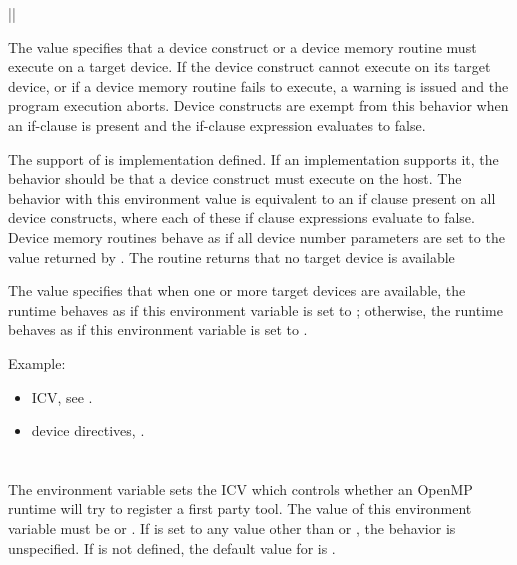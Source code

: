{||}

The  value specifies that a device construct or a device memory routine must execute on a target device. If the device construct cannot execute on its target device, or if a device memory routine fails to execute, a warning is issued and the program execution aborts. Device constructs are exempt from this behavior when an if-clause is present and the if-clause expression evaluates to false.

The support of   is implementation defined. If an implementation supports it, the behavior should be that a device construct must execute on the host.  The behavior with this environment value is equivalent to an if clause present on all device constructs, where each of these if clause expressions evaluate to false. Device memory routines behave as if all device number parameters are set to the value returned by . The  routine returns that no target device is available

The  value specifies that when one or more target devices are available, the runtime behaves as if this environment variable is set to ; otherwise, the runtime behaves as if this environment variable is set to .

Example:
\begin{ompEnv}
\end{ompEnv}

\crossreferences
\begin{itemize}
\item {} ICV, see .
\item device directives, .
\end{itemize}




\section{}
\label{sec:OMP_TOOL}

The  environment variable sets the  ICV which controls whether an OpenMP runtime will try to register a
first party tool.
The value of this environment variable must be  or .
If  is set to any value other than  or , the behavior is unspecified.
If  is not defined, the default value for  is .

